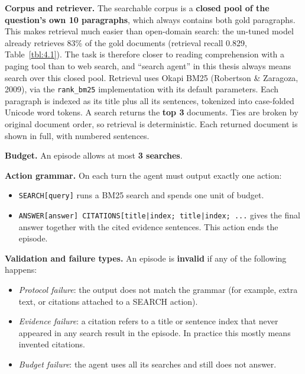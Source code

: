 \textbf{Corpus and retriever.} The searchable corpus is a \textbf{closed
pool of the question's own 10 paragraphs}, which always contains both
gold paragraphs. This makes retrieval much easier than open-domain
search: the un-tuned model already retrieves 83\% of the gold documents
(retrieval recall 0.829, Table~\ref{tbl:4.1}). The task is therefore
closer to reading comprehension with a paging tool than to web search,
and ``search agent'' in this thesis always means search over this closed
pool. Retrieval uses Okapi BM25 (Robertson \& Zaragoza, 2009), via the
\texttt{rank\_\allowbreak{}bm25} implementation with its default
parameters. Each paragraph is indexed as its title plus all its
sentences, tokenized into case-folded Unicode word tokens. A search
returns the \textbf{top 3} documents. Ties are broken by original
document order, so retrieval is deterministic. Each returned document is
shown in full, with numbered sentences.

\textbf{Budget.} An episode allows at most \textbf{3 searches}.

\textbf{Action grammar.} On each turn the agent must output exactly one
action:

\begin{itemize}
\tightlist
\item
  \texttt{SEARCH{[}\allowbreak{}query{]}} runs a BM25 search and spends
  one unit of budget.
\item
  \texttt{ANSWER{[}\allowbreak{}answer{]} CITATIONS{[}\allowbreak{}title|index; title|index; .\allowbreak{}.\allowbreak{}.\allowbreak{}{]}}
  gives the final answer together with the cited evidence sentences.
  This action ends the episode.
\end{itemize}

\textbf{Validation and failure types.} An episode is \textbf{invalid} if
any of the following happens:

\begin{itemize}
\tightlist
\item
  \emph{Protocol failure}: the output does not match the grammar (for
  example, extra text, or citations attached to a SEARCH action).
\item
  \emph{Evidence failure}: a citation refers to a title or sentence
  index that never appeared in any search result in the episode. In
  practice this mostly means invented citations.
\item
  \emph{Budget failure}: the agent uses all its searches and still does
  not answer.
\end{itemize}

